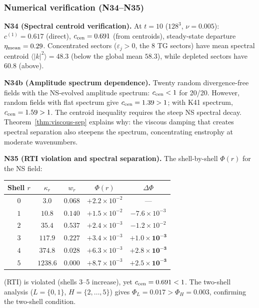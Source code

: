 \documentclass[11pt]{article}
\theoremstyle{definition}
\begin{document}
\subsubsection{Numerical verification (N34--N35)}

\medskip\noindent\textbf{N34 (Spectral centroid
verification).}
At $t=10$ ($128^3$, $\nu=0.005$):
$c^{(1)} = 0.617$ (direct), $c_{\rm cen} = 0.691$
(from centroids), steady-state departure
$\eta_{\rm mean}=0.29$.  Concentrated sectors
($\varepsilon_j>0$, the 8 TG sectors) have mean
spectral centroid $\langle|k|^2\rangle = 48.3$
(below the global mean $58.3$), while depleted sectors
have $60.8$ (above).

\medskip\noindent\textbf{N34b (Amplitude spectrum
dependence).}
Twenty random divergence-free fields with the
NS-evolved amplitude spectrum: $c_{\rm cen}<1$ for
20/20.  However, random fields with flat spectrum
give $c_{\rm cen}=1.39>1$; with K41 spectrum,
$c_{\rm cen}=1.59>1$.  The centroid inequality
requires the steep NS spectral decay.
Theorem~\ref{thm:viscous-sep} explains why: the
viscous damping that creates spectral separation
also steepens the spectrum, concentrating enstrophy
at moderate wavenumbers.

\medskip\noindent\textbf{N35 (RTI violation and
spectral separation).}
The shell-by-shell $\Phi(r)$ for the NS field:
\begin{center}
\renewcommand{\arraystretch}{1.2}
\begin{tabular}{@{}ccccc@{}}
\toprule
Shell $r$ & $\kappa_r$ & $w_r$ & $\Phi(r)$
  & $\Delta\Phi$ \\
\midrule
$0$ & $3.0$ & $0.068$ & $+2.2\!\times\!10^{-2}$ & --- \\
$1$ & $10.8$ & $0.140$ & $+1.5\!\times\!10^{-2}$
  & $-7.6\!\times\!10^{-3}$ \\
$2$ & $35.4$ & $0.537$ & $+2.4\!\times\!10^{-3}$
  & $-1.2\!\times\!10^{-2}$ \\
$3$ & $117.9$ & $0.227$ & $+3.4\!\times\!10^{-3}$
  & $\mathbf{+1.0\!\times\!10^{-3}}$ \\
$4$ & $374.8$ & $0.028$ & $+6.3\!\times\!10^{-3}$
  & $\mathbf{+2.8\!\times\!10^{-3}}$ \\
$5$ & $1238.6$ & $0.000$ & $+8.7\!\times\!10^{-3}$
  & $\mathbf{+2.5\!\times\!10^{-3}}$ \\
\bottomrule
\end{tabular}
\end{center}
(RTI) is violated (shells 3--5 increase), yet
$c_{\rm cen}=0.691<1$.  The two-shell analysis
($L=\{0,1\}$, $H=\{2,\ldots,5\}$) gives
$\Phi_L=0.017>\Phi_H=0.003$, confirming the
two-shell condition.
\end{document}
